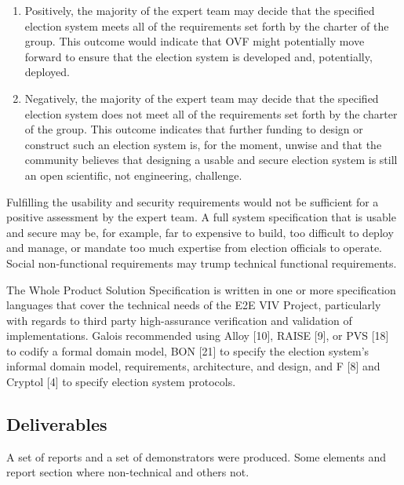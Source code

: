 \begin{enumerate}
\item Positively, the majority of the expert team may decide that the
  specified election system meets all of the requirements set forth by
  the charter of the group. This outcome would indicate that OVF might
  potentially move forward to ensure that the election system is
  developed and, potentially, deployed.
\item Negatively, the majority of the expert team may decide that the
  specified election system does not meet all of the requirements set
  forth by the charter of the group. This outcome indicates that
  further funding to design or construct such an election system is,
  for the moment, unwise and that the community believes that
  designing a usable and secure election system is still an open
  scientific, not engineering, challenge. 
\end{enumerate}

Fulfilling the usability and security requirements would not be
sufficient for a positive assessment by the expert team. A full system
specification that is usable and secure may be, for example, far to
expensive to build, too difficult to deploy and manage, or mandate too
much expertise from election officials to operate. Social
non-functional requirements may trump technical functional
requirements. 

The Whole Product Solution Specification is written in one or more
specification languages that cover the technical needs of the E2E VIV
Project, particularly with regards to third party high-assurance
verification and validation of implementations. Galois recommended
using Alloy [10], RAISE [9], or PVS [18] to codify a formal domain
model, BON [21] to specify the election system's informal domain
model, requirements, architecture, and design, and F [8] and Cryptol
[4] to specify election system protocols. 

\subsection{Deliverables}

A set of reports and a set of demonstrators were produced. Some
elements and report section where non-technical and others not. 

